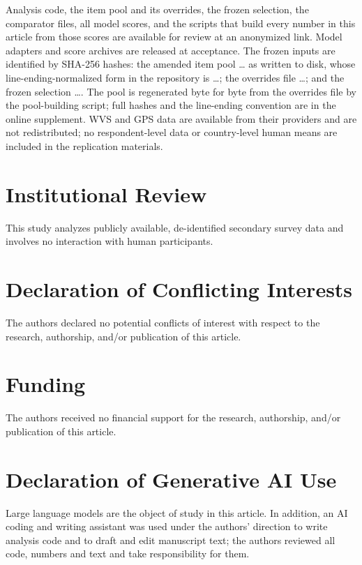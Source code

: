 Analysis code, the item pool and its overrides, the frozen selection, the comparator files, all model scores, and the scripts that build every number in this article from those scores are available for review at an anonymized link. %
Model adapters and score archives are released at acceptance. The frozen inputs are identified by SHA-256 hashes: the amended item pool \ldots{} as written to disk, whose line-ending-normalized form in the repository is \ldots{}; the overrides file \ldots{}; and the frozen selection \ldots{}. The pool is regenerated byte for byte from the overrides file by the pool-building script; full hashes and the line-ending convention are in the online supplement. WVS and GPS data are available from their providers \citep{wvs2022,wvsts2022,falk2018} and are not redistributed; no respondent-level data or country-level human means are included in the replication materials.

\section*{Institutional Review}

This study analyzes publicly available, de-identified secondary survey data and involves no interaction with human participants. %

\section*{Declaration of Conflicting Interests}

The authors declared no potential conflicts of interest with respect to the research, authorship, and/or publication of this article. %

\section*{Funding}

The authors received no financial support for the research, authorship, and/or publication of this article. %

\section*{Declaration of Generative AI Use}

Large language models are the object of study in this article. In addition, an AI coding and writing assistant was used under the authors' direction to write analysis code and to draft and edit manuscript text; the authors reviewed all code, numbers and text and take responsibility for them. %

